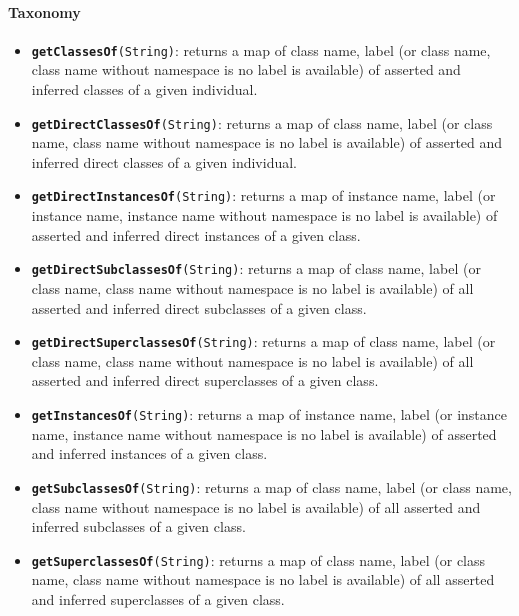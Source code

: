\paragraph{Taxonomy}
\begin{itemize}

    \item {\tt {\bf getClassesOf}(String)}: returns a map of {class name,
    label} (or {class name, class name without namespace} is no label is
    available) of asserted and inferred classes of a given individual.

    \item {\tt {\bf getDirectClassesOf}(String)}: returns a map of {class name,
    label} (or {class name, class name without namespace} is no label is
    available) of asserted and inferred direct classes of a given individual.

    \item {\tt {\bf getDirectInstancesOf}(String)}: returns a map of {instance
    name, label} (or {instance name, instance name without namespace} is no
    label is available) of asserted and inferred direct instances of a given
    class.

    \item {\tt {\bf getDirectSubclassesOf}(String)}: returns a map of {class
    name, label} (or {class name, class name without namespace} is no label is
    available) of all asserted and inferred direct subclasses of a given class.

    \item {\tt {\bf getDirectSuperclassesOf}(String)}: returns a map of {class
    name, label} (or {class name, class name without namespace} is no label is
    available) of all asserted and inferred direct superclasses of a given
    class.

    \item {\tt {\bf getInstancesOf}(String)}: returns a map of {instance name,
    label} (or {instance name, instance name without namespace} is no label is
    available) of asserted and inferred instances of a given class.

    \item {\tt {\bf getSubclassesOf}(String)}: returns a map of {class name,
    label} (or {class name, class name without namespace} is no label is
    available) of all asserted and inferred subclasses of a given class.

    \item {\tt {\bf getSuperclassesOf}(String)}: returns a map of {class name,
    label} (or {class name, class name without namespace} is no label is
    available) of all asserted and inferred superclasses of a given class.
\end{itemize}

